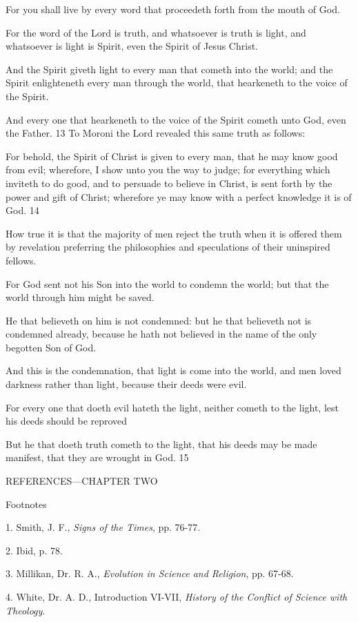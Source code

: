 For you shall live by every word that proceedeth forth from the mouth of God.

For the word of the Lord is truth, and whatsoever is truth is light, and whatsoever is light is
Spirit, even the Spirit of Jesus Christ.

And the Spirit giveth light to every man that cometh into the world; and the Spirit
enlighteneth every man through the world, that hearkeneth to the voice of the Spirit.

And every one that hearkeneth to the voice of the Spirit cometh unto God, even the Father.
13
To Moroni the Lord revealed this same truth as follows:

For behold, the Spirit of Christ is given to every man, that he may know good from evil;
wherefore, I show unto you the way to judge; for everything which inviteth to do good, and
to persuade to believe in Christ, is sent forth by the power and gift of Christ; wherefore ye
may know with a perfect knowledge it is of God. 14

How true it is that the majority of men reject the truth when it is offered them by revelation
preferring the philosophies and speculations of their uninspired fellows.

For God sent not his Son into the world to condemn the world; but that the world through
him might be saved.

He that believeth on him is not condemned: but he that believeth not is condemned already,
because he hath not believed in the name of the only begotten Son of God.

And this is the condemnation, that light is come into the world, and men loved darkness
rather than light, because their deeds were evil.

For every one that doeth evil hateth the light, neither cometh to the light, lest his deeds
should be reproved

But he that doeth truth cometh to the light, that his deeds may be made manifest, that they are
wrought in God. 15

\newpage
REFERENCES—CHAPTER TWO

Footnotes

1. Smith, J. F., \textit{Signs of the Times}, pp. 76-77.

2. Ibid, p. 78.

3. Millikan, Dr. R. A., \textit{Evolution in Science and Religion}, pp. 67-68.

4. White, Dr. A. D., Introduction VI-VII, \textit{History of the Conflict of Science with Theology}.

